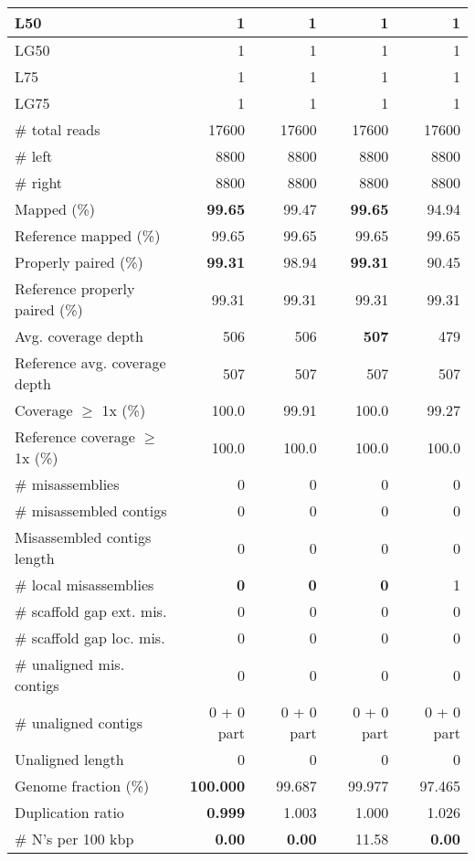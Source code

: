 \documentclass[12pt,a4paper]{article}
\begin{document}
\begin{table}[ht]
\begin{center}
\begin{tabular}{|l*{4}{|r}|}
L50 & 1 & 1 & 1 & 1 \\ \hline
LG50 & 1 & 1 & 1 & 1 \\ \hline
L75 & 1 & 1 & 1 & 1 \\ \hline
LG75 & 1 & 1 & 1 & 1 \\ \hline
\# total reads & 17600 & 17600 & 17600 & 17600 \\ \hline
\# left & 8800 & 8800 & 8800 & 8800 \\ \hline
\# right & 8800 & 8800 & 8800 & 8800 \\ \hline
Mapped (\%) & {\bf 99.65} & 99.47 & {\bf 99.65} & 94.94 \\ \hline
Reference mapped (\%) & 99.65 & 99.65 & 99.65 & 99.65 \\ \hline
Properly paired (\%) & {\bf 99.31} & 98.94 & {\bf 99.31} & 90.45 \\ \hline
Reference properly paired (\%) & 99.31 & 99.31 & 99.31 & 99.31 \\ \hline
Avg. coverage depth & 506 & 506 & {\bf 507} & 479 \\ \hline
Reference avg. coverage depth & 507 & 507 & 507 & 507 \\ \hline
Coverage $\geq$ 1x (\%) & 100.0 & 99.91 & 100.0 & 99.27 \\ \hline
Reference coverage $\geq$ 1x (\%) & 100.0 & 100.0 & 100.0 & 100.0 \\ \hline
\# misassemblies & 0 & 0 & 0 & 0 \\ \hline
\# misassembled contigs & 0 & 0 & 0 & 0 \\ \hline
Misassembled contigs length & 0 & 0 & 0 & 0 \\ \hline
\# local misassemblies & {\bf 0} & {\bf 0} & {\bf 0} & 1 \\ \hline
\# scaffold gap ext. mis. & 0 & 0 & 0 & 0 \\ \hline
\# scaffold gap loc. mis. & 0 & 0 & 0 & 0 \\ \hline
\# unaligned mis. contigs & 0 & 0 & 0 & 0 \\ \hline
\# unaligned contigs & 0 + 0 part & 0 + 0 part & 0 + 0 part & 0 + 0 part \\ \hline
Unaligned length & 0 & 0 & 0 & 0 \\ \hline
Genome fraction (\%) & {\bf 100.000} & 99.687 & 99.977 & 97.465 \\ \hline
Duplication ratio & {\bf 0.999} & 1.003 & 1.000 & 1.026 \\ \hline
\# N's per 100 kbp & {\bf 0.00} & {\bf 0.00} & 11.58 & {\bf 0.00} \\ \hline

\end{tabular}
\end{center}
\end{table}
\end{document}
